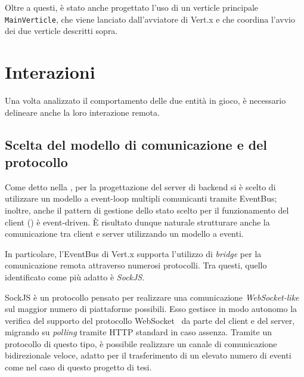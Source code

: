       Oltre a questi, è stato anche progettato l'uso di un verticle principale \texttt{MainVerticle}, che viene lanciato dall'avviatore di Vert.x e che coordina l'avvio dei due verticle descritti sopra.

    

  \section{Interazioni}\label{sec:arch:interaction}


    Una volta analizzato il comportamento delle due entità in gioco, è necessario delineare anche la loro interazione remota.

    \subsection{Scelta del modello di comunicazione e del protocollo}

      Come detto nella , per la progettazione del server di backend si è scelto di utilizzare un modello a event-loop multipli comunicanti tramite EventBus;
      inoltre, anche il pattern di gestione dello stato scelto per il funzionamento del client () è event-driven.
      È risultato dunque naturale strutturare anche la comunicazione tra client e server utilizzando un modello a eventi.

      In particolare, l'EventBus di Vert.x supporta l'utilizzo di \emph{bridge} per la comunicazione remota attraverso numerosi protocolli.
      Tra questi, quello identificato come più adatto è \emph{SockJS}\@.

      SockJS è un protocollo pensato per realizzare una comunicazione \emph{WebSocket-like} sul maggior numero di piattaforme possibili.
      Esso gestisce in modo autonomo la verifica del supporto del protocollo WebSocket~\cite{Melnikov2011} da parte del client e del server, migrando su \emph{polling} tramite HTTP standard in caso assenza.
      Tramite un protocollo di questo tipo, è possibile realizzare un canale di comunicazione bidirezionale veloce, adatto per il trasferimento di un elevato numero di eventi come nel caso di questo progetto di tesi.

